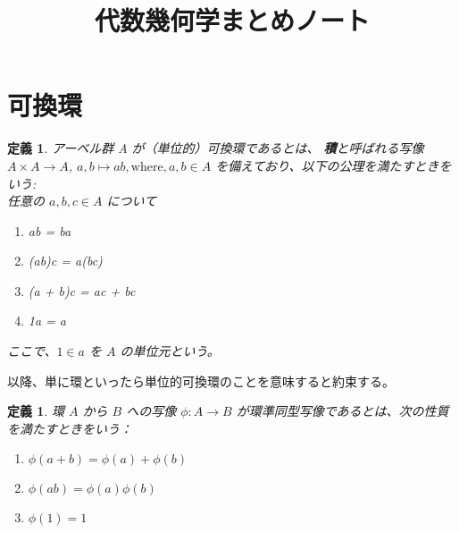 \documentclass[uplatex]{jsreport}
\title{代数幾何学まとめノート}
\date{}
\newtheorem{dfn}[thm]{定義}
\begin{document}
\maketitle

\section{可換環}
\begin{dfn}
アーベル群 A が（単位的）可換環であるとは、
\textbf{積}と呼ばれる写像 $A \times A \to A$, $a, b \mapsto ab, \text{where}, a, b \in A$
を備えており、以下の公理を満たすときをいう: \\

任意の $a, b, c \in A$ について
\begin{enumerate}
    \item ab = ba
    \item (ab)c = a(bc)
    \item (a + b)c = ac + bc
    \item 1a = a
\end{enumerate}
ここで、$1 \in a$ を $A$ の単位元という。
\end{dfn}
以降、単に環といったら単位的可換環のことを意味すると約束する。

\begin{dfn}
    環 $A$ から $B$ への写像 $\phi: A \to B$ が環準同型写像であるとは、次の性質を満たすときをいう：
    \begin{enumerate}
        \item $\phi(a + b) = \phi(a) + \phi(b)$
        \item $\phi(ab) = \phi(a)\phi(b)$
        \item $\phi(1) = 1$
    \end{enumerate}
\end{dfn}
\end{document}
